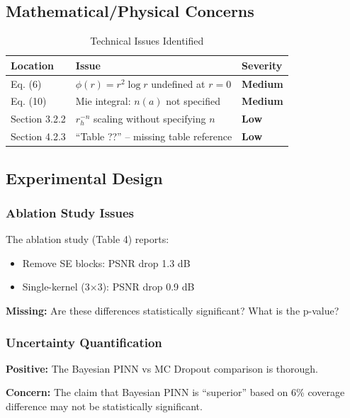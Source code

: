 \documentclass[12pt,a4paper]{article}
\newcommand{\warning}[1]{\textcolor{WarningOrange}{\textbf{#1}}}
\newcommand{\good}[1]{\textcolor{GoodGreen}{\textbf{#1}}}
\begin{document}
\subsection{Mathematical/Physical Concerns}

\begin{table}[h]
\centering
\caption{Technical Issues Identified}
\begin{tabular}{@{}lll@{}}
\toprule
\textbf{Location} & \textbf{Issue} & \textbf{Severity} \\
\midrule
Eq. (6) & $\phi(r) = r^2 \log r$ undefined at $r=0$ & \warning{Medium} \\
Eq. (10) & Mie integral: $n(a)$ not specified & \warning{Medium} \\
Section 3.2.2 & $r_h^{-n}$ scaling without specifying $n$ & \warning{Low} \\
Section 4.2.3 & ``Table ??'' -- missing table reference & \warning{Low} \\
\bottomrule
\end{tabular}
\end{table}

\subsection{Experimental Design}

\subsubsection{Ablation Study Issues}

The ablation study (Table 4) reports:
\begin{itemize}
    \item Remove SE blocks: PSNR drop 1.3 dB
    \item Single-kernel (3$\times$3): PSNR drop 0.9 dB
\end{itemize}

\warning{Missing:} Are these differences statistically significant? What is the p-value?

\subsubsection{Uncertainty Quantification}

\good{Positive:} The Bayesian PINN vs MC Dropout comparison is thorough.

\warning{Concern:} The claim that Bayesian PINN is ``superior'' based on 6\% coverage difference may not be statistically significant.
\end{document}
